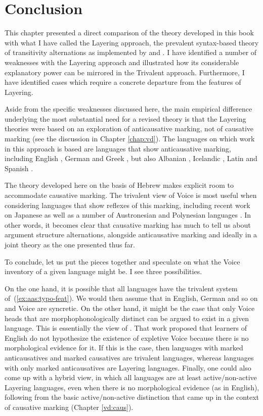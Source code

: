 \section{Conclusion} \label{aas:conc}
This chapter presented a direct comparison of the theory developed in this book with what I have called the Layering approach, the prevalent syntax-based theory of transitivity alternations as implemented by \cite{schaefer08,schaefer17oup} and \cite{layering15}. I have identified a number of weaknesses with the Layering approach and illustrated how its considerable explanatory power can be mirrored in the Trivalent approach. Furthermore, I have identified cases which require a concrete departure from the features of Layering.

Aside from the specific weaknesses discussed here, the main empirical difference underlying the most substantial need for a revised theory is that the Layering theories were based on an exploration of anticausative marking, not of causative marking (see the discussion in Chapter \ref{chap:vd}). The languages on which work in this approach is based are languages that show anticausative marking, including English \citep{myler16mit}, German \citep{schaefer17oup} and Greek \citep{spathasetal15}, but also Albanian \citep{kallulli13}, Icelandic \citep{wood15springer}, Latin \citep{embick04,kastnerzu17} and Spanish \citep{schaefervivanco16}.

The theory developed here on the basis of Hebrew makes explicit room to accommodate causative marking. The trivalent view of Voice is most useful when considering languages that show reflexes of this marking, including recent work on Japanese \citep{oseki17nyu} as well as a number of Austronesian and Polynesian languages \citep{nie17}. In other words, it becomes clear that causative marking has much to tell us about argument structure alternations, alongside anticausative marking and ideally in a joint theory as the one presented thus far.

To conclude, let us put the pieces together and speculate on what the Voice inventory of a given language might be. I see three possibilities.

On the one hand, it is possible that all languages have the trivalent system of~(\ref{ex:aas:typo-feat}). We would then assume that in English, German and so on {\vd} and Voice are syncretic. On the other hand, it might be the case that only Voice heads that are morphophonologically distinct can be argued to exist in a given language. This is essentially the view of \cite{layering15}. That work proposed that learners of English do not hypothesize the existence of expletive Voice because there is no morphological evidence for it. If this is the case, then languages with marked anticausatives and marked causatives are trivalent languages, whereas languages with only marked anticausatives are Layering languages. Finally, one could also come up with a hybrid view, in which all languages are at least active/non-active Layering languages, even when there is no morphological evidence (as in English), following from the basic active/non-active distinction that came up in the context of causative marking (Chapter \ref{vd:caus}).

